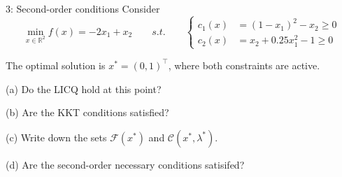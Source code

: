 
\begin{problem}{3: Second-order conditions}
Consider
\[
  \min_{x \in \mathbb{R}^{2}} f(x) = -2x_1 + x_2 \qquad s.t. \qquad 
  \left\{
    \begin{aligned}
      c_1(x) &= (1-x_1)^2 - x_2 \geq 0 \\
      c_2(x) &= x_2 + 0.25x_1^2 - 1 \geq 0
    \end{aligned}
    \right
.\] 

The optimal solution is $x^{*} = (0, 1)^{\top}$, where both constraints are active. 

\medskip

(a) Do the LICQ hold at this point?

\medskip

(b) Are the KKT conditions satisfied?

\medskip

(c) Write down the sets $\mathcal{F}(x^{*})$ and $\mathcal{C}(x^{*}, \lambda^{*})$.

\medskip

(d) Are the second-order necessary conditions satisifed?


\end{problem}


